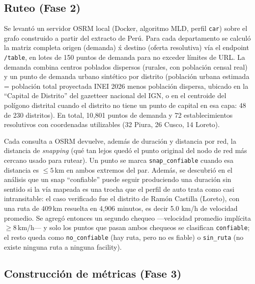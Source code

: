 \documentclass[11pt]{article}
\begin{document}


\subsection{Ruteo (Fase 2)}

Se levant\'o un servidor OSRM local (Docker, algoritmo MLD, perfil
\texttt{car}) sobre el grafo construido a partir del extracto de Per\'u.
Para cada departamento se calcul\'o la matriz completa origen (demanda)
\'x destino (oferta resolutiva) v\'ia el endpoint \texttt{/table}, en
lotes de 150 puntos de demanda para no exceder l\'imites de URL. La
demanda combina centros poblados dispersos (rurales, con poblaci\'on
censal real) y un punto de demanda urbano sint\'etico por distrito
(poblaci\'on urbana estimada = poblaci\'on total proyectada INEI 2026
menos poblaci\'on dispersa, ubicado en la ``Capital de Distrito'' del
gazetteer nacional del IGN, o en el centroide del pol\'igono distrital
cuando el distrito no tiene un punto de capital en esa capa: 48 de 230
distritos). En total, 10{,}801 puntos de demanda y 72 establecimientos
resolutivos con coordenadas utilizables (32 Piura, 26 Cusco, 14 Loreto).

Cada consulta a OSRM devuelve, adem\'as de duraci\'on y distancia por red,
la distancia de \emph{snapping} (qu\'e tan lejos qued\'o el punto original
del nodo de red m\'as cercano usado para rutear). Un punto se marca
\texttt{snap\_confiable} cuando esa distancia es $\leq 5$\,km en ambos
extremos del par. Adem\'as, se descubri\'o en el an\'alisis que un snap
``confiable'' puede seguir produciendo una duraci\'on sin sentido si la
v\'ia mapeada es una trocha que el perfil de auto trata como casi
intransitable: el caso verificado fue el distrito de Ram\'on Castilla
(Loreto), con una ruta de 409\,km resuelta en 4{,}906 minutos, es decir 5.0
km/h de velocidad promedio. Se agreg\'o entonces un segundo chequeo
---velocidad promedio impl\'icita $\geq 8$\,km/h--- y solo los puntos que
pasan ambos chequeos se clasifican \texttt{confiable}; el resto queda como
\texttt{no\_confiable} (hay ruta, pero no es fiable) o \texttt{sin\_ruta}
(no existe ninguna ruta a ninguna facility).

\subsection{Construcci\'on de m\'etricas (Fase 3)}
\end{document}

